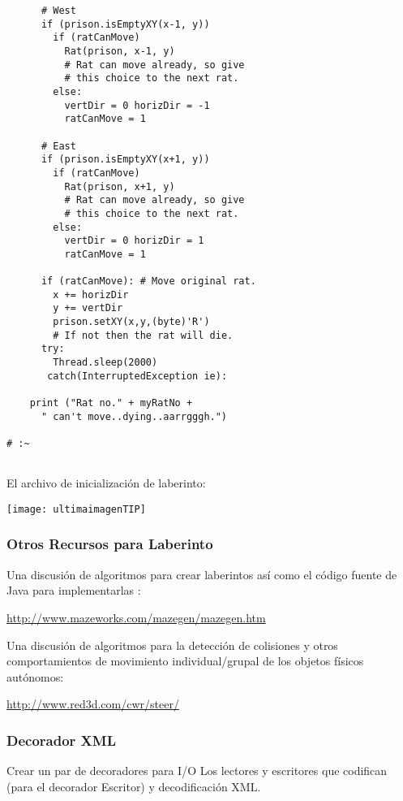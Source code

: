 \begin{lstlisting}
      # West 
      if (prison.isEmptyXY(x-1, y)) 
        if (ratCanMove) 
          Rat(prison, x-1, y)    
          # Rat can move already, so give  
          # this choice to the next rat. 
        else: 
          vertDir = 0 horizDir = -1          
          ratCanMove = 1 
          
      # East 
      if (prison.isEmptyXY(x+1, y)) 
        if (ratCanMove) 
          Rat(prison, x+1, y)    
          # Rat can move already, so give  
          # this choice to the next rat. 
        else: 
          vertDir = 0 horizDir = 1          
          ratCanMove = 1 
          
      if (ratCanMove): # Move original rat. 
        x += horizDir 
        y += vertDir 
        prison.setXY(x,y,(byte)'R') 
        # If not then the rat will die. 
      try: 
        Thread.sleep(2000)    
       catch(InterruptedException ie): 
       
    print ("Rat no." + myRatNo +  
      " can't move..dying..aarrgggh.") 
      
# :~     
    
\end{lstlisting}

El archivo de inicialización de laberinto:

\texttt{[image: ultimaimagenTIP]}


\subsubsection*{Otros Recursos para Laberinto}
\label{subsubsec:orpl}


Una discusión de algoritmos para crear laberintos así como el código fuente de Java para implementarlas : \newline

\textcolor[rgb]{0.2,0.5,0.7}{\underline{http://www.mazeworks.com/mazegen/mazegen.htm}} \newline      %

Una discusión de algoritmos para la detección de colisiones y otros comportamientos de movimiento individual/grupal de los objetos físicos autónomos: \newline

\textcolor[rgb]{0.2,0.5,0.7}{\underline{http://www.red3d.com/cwr/steer/}}


\subsubsection*{Decorador XML}
\label{subsubsec:dxml}


Crear un par de decoradores para I/O Los lectores y escritores que codifican (para el decorador Escritor) y decodificación XML.